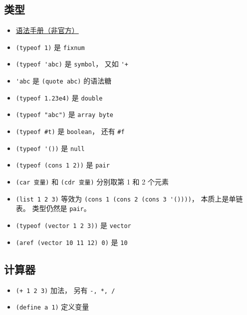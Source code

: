 
\subsection{类型}
\begin{itemize}
\item \href{https://code.google.com/archive/p/femtolisp/wikis/Manual.wiki}{语法手册（非官方）}
\item \verb`(typeof 1)` 是 \verb`fixnum`
\item \verb`(typeof 'abc)` 是 \verb`symbol`， 又如 \verb`'+`
\item \verb`'abc` 是 \verb`(quote abc)` 的语法糖
\item \verb`(typeof 1.23e4)` 是 \verb`double`
\item \verb`(typeof "abc")` 是 \verb`array byte`
\item \verb`(typeof #t)` 是 \verb`boolean`， 还有 \verb`#f`
\item \verb`(typeof '())` 是 \verb`null`
\item \verb`(typeof (cons 1 2))` 是 \verb`pair`
\item \verb`(car 变量)` 和 \verb`(cdr 变量)` 分别取第 1 和 2 个元素
\item \verb`(list 1 2 3)` 等效为 \verb`(cons 1 (cons 2 (cons 3 '())))`， 本质上是单链表。 类型仍然是 \verb`pair`。
\item \verb`(typeof (vector 1 2 3))` 是 \verb`vector`
\item \verb`(aref (vector 10 11 12) 0)` 是 \verb`10`
\end{itemize}

\subsection{计算器}
\begin{itemize}
\item \verb`(+ 1 2 3)` 加法， 另有 \verb`-, *, /`
\item \verb`(define a 1)` 定义变量
\end{itemize}

